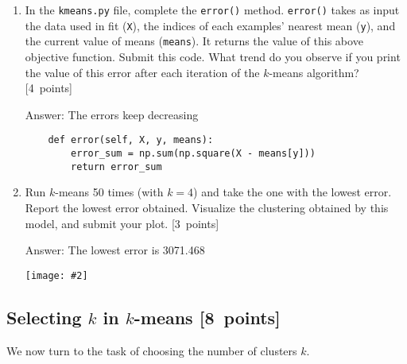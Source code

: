 \documentclass{article}
\newcommand{\blu}[1]{{\textcolor{blu}{#1}}}
\newenvironment{answer}{\par\begingroup\color{gre}Answer: }{\endgroup}
\let\ask\blu
\newcommand\pts[1]{\textcolor{pointscolour}{[#1~points]}}
\newcommand{\centerfig}[2]{\begin{center}\texttt{[image: \#2]}\end{center}}
\begin{document}
    \begin{enumerate}
        \item In the \texttt{kmeans.py} file, complete the \texttt{error()} method. \texttt{error()} takes as input the data used in fit (\texttt{X}), the indices of each examples' nearest mean (\texttt{y}), and the current value of means (\texttt{means}). It returns the value of this above objective function. \ask{Submit this code. What trend do you observe if you print the value of this error after each iteration of the $k$-means algorithm?} \pts{4}
        \begin{answer}
            The errors keep decreasing
            \begin{verbatim}
    def error(self, X, y, means):
        error_sum = np.sum(np.square(X - means[y]))
        return error_sum
            \end{verbatim}
        \end{answer}
        \item Run $k$-means 50 times (with $k=4$) and take the one with the lowest error. \ask{Report the lowest error obtained.} Visualize the clustering obtained by this model, and \ask{submit your plot}. \pts{3}
        \begin{answer}
            The lowest error is 3071.468
            \centerfig{.5}{figs/kmeans_50_run.png}
        \end{answer}
    \end{enumerate}


    \subsection{Selecting $k$ in $k$-means \pts{8}}

    We now turn to the task of choosing the number of clusters $k$.
\end{document}
